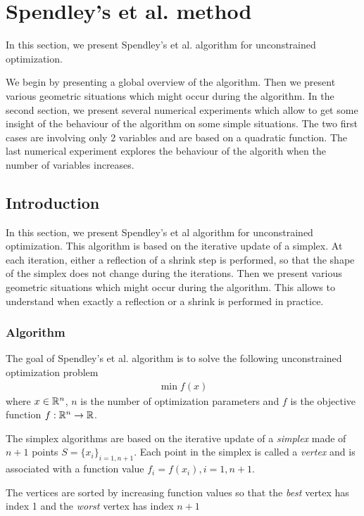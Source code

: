 \chapter{Spendley's et al. method}

In this section, we present Spendley's et al. algorithm \cite{Spendley1962} for 
unconstrained optimization.

We begin by presenting a global overview of the algorithm. 
Then we present various geometric situations which might occur
during the algorithm. In the second section, we present several 
numerical experiments which allow to get some insight of the behaviour 
of the algorithm on some simple situations. The two first cases 
are involving only 2 variables and are based on a quadratic function.
The last numerical experiment explores the behaviour of the algorith
when the number of variables increases.

\section{Introduction}

In this section, we present Spendley's et al algorithm for unconstrained optimization.
This algorithm is based on the iterative update of a simplex. 
At each iteration, either a reflection of a shrink step is performed, so that
the shape of the simplex does not change during the iterations.
Then we present various geometric situations which might occur
during the algorithm. This allows to understand when exactly a reflection 
or a shrink is performed in practice.

\subsection{Algorithm}

The goal of Spendley's et al. algorithm is to solve the 
following unconstrained optimization problem
\begin{eqnarray}
\min f(x)
\end{eqnarray}
where $x\in \mathbb{R}^n$, $n$ is the number of optimization parameters and $f$ is the objective 
function $f:\mathbb{R}^n\rightarrow \mathbb{R}$.

The simplex algorithms are based on the iterative update of 
a \emph{simplex} made of $n+1$ points $S=\{x_i\}_{i=1,n+1}$. Each point 
in the simplex is called a \emph{vertex} and is associated with 
a function value $f_i=f(x_i), i=1,n+1$.

The vertices are sorted by increasing function values so that the 
\emph{best} vertex has index 1 and the \emph{worst} vertex 
has index $n+1$

